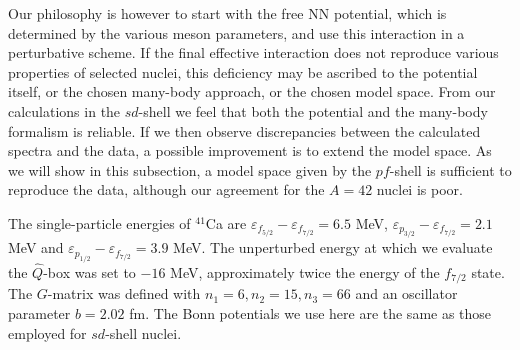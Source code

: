 Our philosophy is however to start with the free NN potential,
which is determined by the various meson parameters, and
use this interaction in a perturbative scheme. If the final
effective interaction does not reproduce various
properties of selected nuclei, this deficiency may be ascribed
to the potential itself, or the chosen many-body approach,
or the chosen model space. From our calculations in the
$sd$-shell we feel that both the potential and the many-body
formalism is reliable. If we then observe discrepancies
between the calculated spectra and the data, a possible
improvement is to extend the model space.
As we will show in this subsection,
a model
space given by the $pf$-shell
is sufficient to reproduce the data, although our agreement
for the $A=42$ nuclei is poor.

The single-particle energies of $^{41}$Ca are \cite{kb68}
$\varepsilon_{f_{5/2}}-\varepsilon_{f_{7/2}}=6.5$ MeV,
$\varepsilon_{p_{3/2}}-\varepsilon_{f_{7/2}}=2.1$ MeV and
$\varepsilon_{p_{1/2}}-\varepsilon_{f_{7/2}}=3.9$ MeV.
The unperturbed energy at which
we evaluate the $\hat{Q}$-box was set to $-16$ MeV,
approximately twice the energy
of the $f_{7/2}$ state. The $G$-matrix was defined  with
$n_1=6, n_2=15, n_3 =66$ and an oscillator parameter
$b=2.02$ fm.
The Bonn
potentials
we use here are the same as those employed for $sd$-shell nuclei.

